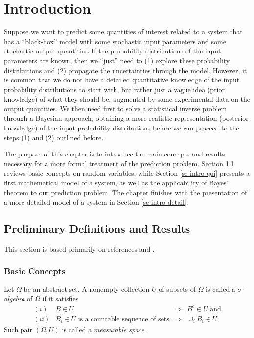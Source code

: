 \chapter{Introduction}\label{ch-int}
\thispagestyle{headings}

Suppose we want to predict some quantities of interest related to a system that
has a ``black-box'' model with
some stochastic input parameters and
some stochastic output quantities.
If the probability distributions of the input parameters are known, then we ``just'' need to
(1) explore these probability distributions and (2) propagate the uncertainties through the model.
However, it is common that we do not have a detailed quantitative knowledge of the input probability distributions to start with,
but rather just a vague idea (prior knowledge) of what they should be, augmented by some experimental data on the output quantities.
We then need first to solve a statistical inverse problem through a Bayesian approach, obtaining a more realistic representation
(posterior knowledge) of the input probability distributions before we can proceed to the steps (1) and (2) outlined before.

The purpose of this chapter is to introduce the main concepts and results necessary for
a more formal treatment of the prediction problem.
Section \ref{sc-intro-prelim} reviews basic concepts on random variables, while
Section \ref{sc-intro-qoi} presents a first mathematical model of a system, as well as the applicability of Bayes' theorem to our prediction problem.
The chapter finishes with the presentation of a more detailed model of a system in Section \ref{sc-intro-detail}.

\section{Preliminary Definitions and Results}\label{sc-intro-prelim}

This section is based primarily on references \cite{Du05} and \cite{JaPr04}.

\subsection{Basic Concepts}\label{subsc-intro-prelim-basic}

Let $\Omega$ be an abstract set. A nonempty collection $U$ of subsets of $\Omega$ is called a {\it $\sigma$-algebra} of $\Omega$ if it satisfies
\[
\begin{array}{rlcl}
 (i) & B\in U                                          & \Rightarrow & B^c\in U\mbox{ and} \\
(ii) & B_i\in U\mbox{ is a countable sequence of sets} & \Rightarrow & \cup_iB_i\in U.
\end{array}
\]
Such pair $(\Omega,U)$ is called a {\it measurable space}.

